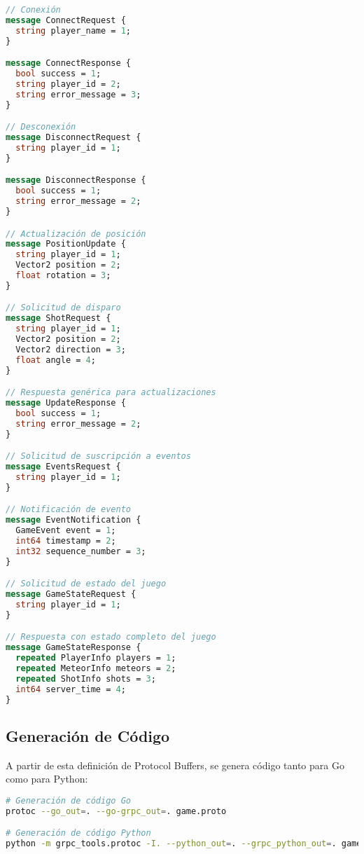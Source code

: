 \documentclass[12pt,letterpaper]{article}
\begin{document}
\begin{lstlisting}[language=proto, caption=Mensajes de solicitud y respuesta]
// Conexión
message ConnectRequest {
  string player_name = 1;
}

message ConnectResponse {
  bool success = 1;
  string player_id = 2;
  string error_message = 3;
}

// Desconexión
message DisconnectRequest {
  string player_id = 1;
}

message DisconnectResponse {
  bool success = 1;
  string error_message = 2;
}

// Actualización de posición
message PositionUpdate {
  string player_id = 1;
  Vector2 position = 2;
  float rotation = 3;
}

// Solicitud de disparo
message ShotRequest {
  string player_id = 1;
  Vector2 position = 2;
  Vector2 direction = 3;
  float angle = 4;
}

// Respuesta genérica para actualizaciones
message UpdateResponse {
  bool success = 1;
  string error_message = 2;
}

// Solicitud de suscripción a eventos
message EventsRequest {
  string player_id = 1;
}

// Notificación de evento
message EventNotification {
  GameEvent event = 1;
  int64 timestamp = 2;
  int32 sequence_number = 3;
}

// Solicitud de estado del juego
message GameStateRequest {
  string player_id = 1;
}

// Respuesta con estado completo del juego
message GameStateResponse {
  repeated PlayerInfo players = 1;
  repeated MeteorInfo meteors = 2;
  repeated ShotInfo shots = 3;
  int64 server_time = 4;
}
\end{lstlisting}

\subsection{Generación de Código}

A partir de esta definición de Protocol Buffers, se genera código tanto para Go como para Python:

\begin{lstlisting}[language=bash, caption=Comandos para generar código a partir del archivo proto]
# Generación de código Go
protoc --go_out=. --go-grpc_out=. game.proto

# Generación de código Python
python -m grpc_tools.protoc -I. --python_out=. --grpc_python_out=. game.proto
\end{lstlisting}
\end{document}
